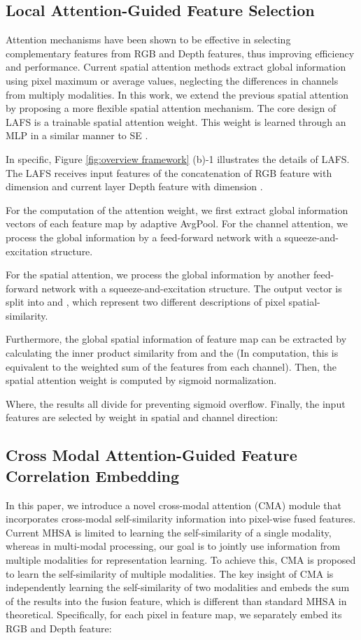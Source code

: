 \documentclass[letterpaper, 10 pt, conference]{ieeeconf}
\begin{document}
\subsection{Local Attention-Guided Feature Selection}
Attention mechanisms have been shown to be effective in selecting complementary features from RGB and Depth features, thus improving efficiency and performance\cite{hu2019acnet,yu2021bisenet,du2022pscnet,liu2022cmx}. Current spatial attention methods extract global information using pixel maximum or average values, neglecting the differences in channels from multiply modalities. In this work, we extend the previous spatial attention by proposing a more flexible spatial attention mechanism. The core design of LAFS is a trainable spatial attention weight. This weight is learned through an MLP in a similar manner to SE \cite{hu2018squeeze}.

In specific, Figure \ref{fig:overview framework} (b)-1 illustrates the details of LAFS. The LAFS receives input features of the concatenation of RGB feature  with dimension  and current layer Depth feature  with dimension .


For the computation of the attention weight, we first extract global information vectors  of each feature map by adaptive AvgPool. For the channel attention, we process the global information by a feed-forward network with a squeeze-and-excitation structure.

For the spatial attention, we process the global information  by another feed-forward network with a squeeze-and-excitation structure. The output vector is split into  and , which represent two different descriptions of pixel spatial-similarity.

Furthermore, the global spatial information  of feature map can be extracted by calculating the inner product similarity from  and the  (In computation, this is equivalent to the weighted sum of the features from each channel). Then, the spatial attention weight  is computed by sigmoid normalization.

Where, the results all divide  for preventing sigmoid overflow. Finally, the input features are selected by weight in spatial and channel  direction:




\subsection{Cross Modal Attention-Guided Feature Correlation Embedding}
In this paper, we introduce a novel cross-modal attention (CMA) module that incorporates cross-modal self-similarity information into pixel-wise fused features. Current MHSA \cite{vaswani2017attention} is limited to learning the self-similarity of a single modality, whereas in multi-modal processing, our goal is to jointly use information from multiple modalities for representation learning. To achieve this, CMA is proposed to learn the self-similarity of multiple modalities. The key insight of CMA is independently learning the self-similarity of two modalities and embeds the sum of the results into the fusion feature, which is different than standard MHSA in theoretical. Specifically, for each pixel  in feature map, we separately embed its RGB and Depth feature:
\end{document}

